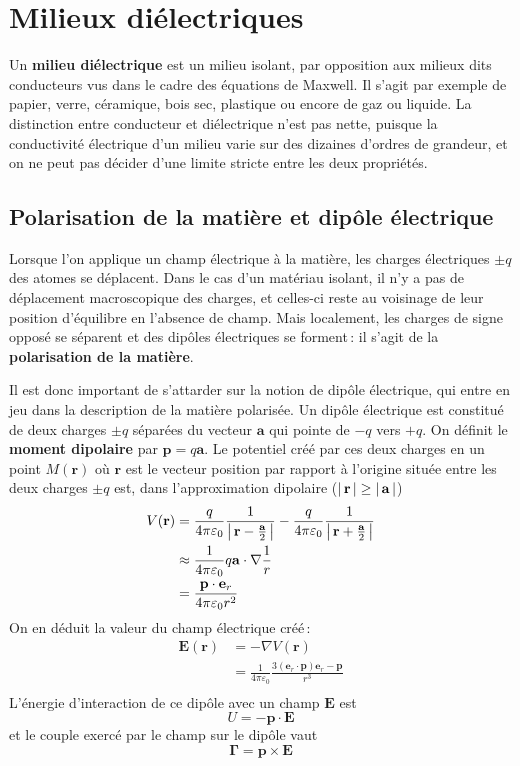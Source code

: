 \section{Milieux diélectriques}

    Un \textbf{milieu diélectrique} est un milieu isolant, par opposition aux milieux dits conducteurs vus dans le cadre des équations de Maxwell. Il s’agit par exemple de papier, verre, céramique, bois sec, plastique ou encore de gaz ou liquide. La distinction entre conducteur et diélectrique n’est pas nette, puisque la conductivité électrique d’un milieu varie sur des dizaines d’ordres de grandeur, et on ne peut pas décider d’une limite stricte entre les deux propriétés. 

    \subsection{Polarisation de la matière et dipôle électrique}

    Lorsque l’on applique un champ électrique à la matière, les charges électriques $\pm q$ des atomes se déplacent. Dans le cas d’un matériau isolant, il n’y a pas de déplacement macroscopique des charges, et celles-ci reste au voisinage de leur position d’équilibre en l’absence de champ. Mais localement, les charges de signe opposé se séparent et des dipôles électriques se forment : il s’agit de la \textbf{polarisation de la matière}.

    Il est donc important de s’attarder sur la notion de dipôle électrique, qui entre en jeu dans la description de la matière polarisée. Un dipôle électrique est constitué de deux charges $\pm q$ séparées du vecteur $\textbf{a}$ qui pointe de $-q$ vers $+q$. On définit le \textbf{moment dipolaire} par $\mathbf{p} = q \mathbf{a}$. Le potentiel créé par ces deux charges en un point $M(\mathbf{r})$ où $\mathbf{r}$ est le vecteur position par rapport à l’origine située entre les deux charges $\pm q$ est, dans l’approximation dipolaire ($\left\lvert \, \mathbf{r} \, \right\rvert \geq \left\lvert \, \mathbf{a} \, \right\rvert$)
    \begin{align*}
        V(\mathbf{r}) 
        &= \frac{q}{4\pi\varepsilon_0}\frac{1}{\left\lvert \, \mathbf{r} - \frac{\mathbf{a}}{2} \, \right\rvert} - \frac{q}{4\pi\varepsilon_0}\frac{1}{\left\lvert \, \mathbf{r} + \frac{\mathbf{a}}{2} \, \right\rvert} \\
        &\approx \frac{1}{4\pi\varepsilon_0} q \mathbf{a} \cdot \nabla \frac{1}{r} \\
        &= \frac{\mathbf{p} \cdot \mathbf{e}_r}{4\pi\varepsilon_0 r^2}
    \end{align*}
    On en déduit la valeur du champ électrique créé :
    \begin{align*}
        \mathbf{E}(\mathbf{r}) 
        &= - \nabla V(\mathbf{r}) \\
        &= \frac{1}{4\pi\varepsilon_0} \frac{3 (\mathbf{e}_r \cdot \mathbf{p})\mathbf{e}_r - \mathbf{p}}{r^3} \\
    \end{align*}
    L’énergie d’interaction de ce dipôle avec un champ $\mathbf{E}$ est 
    \[ U = - \mathbf{p} \cdot \mathbf{E} \]   
    et le couple exercé par le champ sur le dipôle vaut 
    \[ \mathbf{\Gamma} = \mathbf{p} \times \mathbf{E} \]

